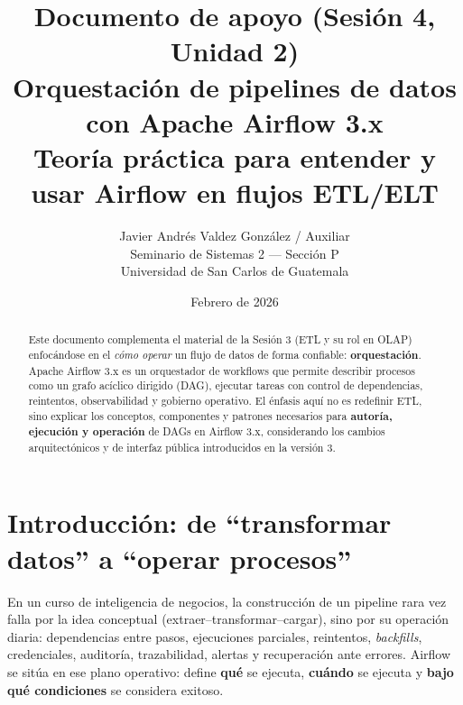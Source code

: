 \usepackage{fancyhdr}
\pagestyle{fancy}
\fancyhf{}
\cfoot{\thepage}
\renewcommand{\headrulewidth}{0.4pt}
\renewcommand{\footrulewidth}{0pt}

\usepackage[
  backend=biber,
  style=ieee,
  sorting=nyt,
  maxbibnames=99
]{biblatex}


\title{\textbf{Documento de apoyo (Sesión 4, Unidad 2)}\\
\large Orquestación de pipelines de datos con Apache Airflow 3.x\\
\normalsize Teoría práctica para entender y usar Airflow en flujos ETL/ELT}
\author{Javier Andrés Valdez González / Auxiliar \\
\small Seminario de Sistemas 2 — Sección P \\
\small Universidad de San Carlos de Guatemala}
\date{Febrero de 2026}


\maketitle

\begin{abstract}
Este documento complementa el material de la Sesión 3 (ETL y su rol en OLAP) enfocándose en el \textit{cómo operar} un flujo de datos de forma confiable: \textbf{orquestación}. Apache Airflow 3.x es un orquestador de workflows que permite describir procesos como un grafo acíclico dirigido (DAG), ejecutar tareas con control de dependencias, reintentos, observabilidad y gobierno operativo. El énfasis aquí no es redefinir ETL, sino explicar los conceptos, componentes y patrones necesarios para \textbf{autoría, ejecución y operación} de DAGs en Airflow 3.x, considerando los cambios arquitectónicos y de interfaz pública introducidos en la versión 3.
\end{abstract}

\section{Introducción: de ``transformar datos'' a ``operar procesos''}
En un curso de inteligencia de negocios, la construcción de un pipeline rara vez falla por la idea conceptual (extraer--transformar--cargar), sino por su operación diaria: dependencias entre pasos, ejecuciones parciales, reintentos, \textit{backfills}, credenciales, auditoría, trazabilidad, alertas y recuperación ante errores. Airflow se sitúa en ese plano operativo: define \textbf{qué} se ejecuta, \textbf{cuándo} se ejecuta y \textbf{bajo qué condiciones} se considera exitoso.

